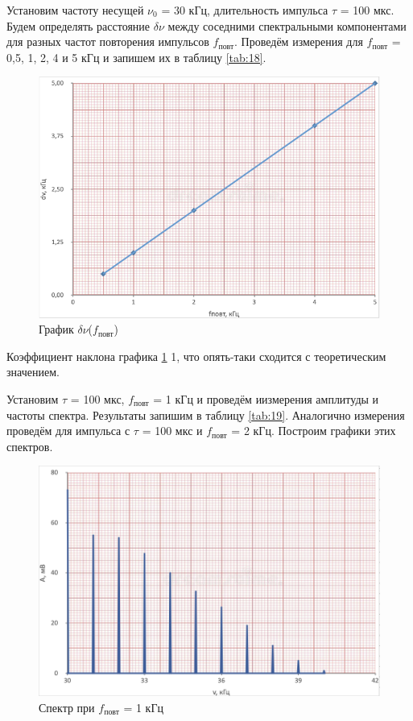 \documentclass[12pt,a4paper]{article}
\begin{document}
Установим частоту несущей $\nu_0$ = 30 кГц, длительность импульса $\tau$ = 100 мкс. Будем определять расстояние $\delta \nu$ между соседними спектральными компонентами для разных частот повторения импульсов $f_\text{повт}$. Проведём измерения для $f_\text{повт}$ = 0,5, 1, 2, 4 и 5 кГц и запишем их в таблицу \ref{tab:18}.

\begin{table}[H]
    \caption{Зависимость $\delta \nu$ от $f_\text{повт}$}
    
	\label{tab:18}
\end{table}

\begin{figure}[H]
	\centering
	\includegraphics[width = 10 cm]{src/20.png}
	\caption{График $\delta \nu$($f_\text{повт}$)}
	\label{fig:20}
\end{figure}

Коэффициент наклона графика \ref{fig:20} 1, что опять-таки сходится с теоретическим значением.

Установим $\tau$ = 100 мкс, $f_\text{повт}$ = 1 кГц и проведём иизмерения амплитуды и частоты спектра. Результаты запишим в таблицу \ref{tab:19}. Аналогично измерения проведём для импульса с $\tau$ = 100 мкс и $f_\text{повт}$ = 2 кГц. Построим графики этих спектров.

\begin{table}[H]
    \caption{Измерения спектров для $f_\text{повт}$ = 1 кГц и $f_\text{повт}$ = 2 кГц}
    
	\label{tab:19}
\end{table}

\begin{figure}[H]
	\centering
	\includegraphics[width = 10 cm]{src/19_1.png}
	\caption{Спектр при $f_\text{повт}$ = 1 кГц}
	\label{fig:19_1}
\end{figure}
\end{document}
